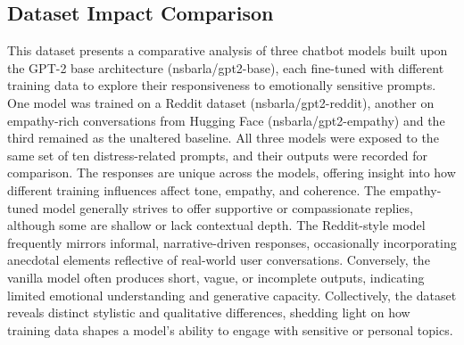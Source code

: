 \subsection{Dataset Impact Comparison} 
This dataset presents a comparative analysis of three chatbot models built upon the GPT-2 base architecture (nsbarla/gpt2-base), each fine-tuned with different training data to explore their responsiveness to emotionally sensitive prompts. One model was trained on a Reddit dataset (nsbarla/gpt2-reddit), another on empathy-rich conversations from Hugging Face (nsbarla/gpt2-empathy) and the third remained as the unaltered baseline. All three models were exposed to the same set of ten distress-related prompts, and their outputs were recorded for comparison. The responses are unique across the models, offering insight into how different training influences affect tone, empathy, and coherence. The empathy-tuned model generally strives to offer supportive or compassionate replies, although some are shallow or lack contextual depth. The Reddit-style model frequently mirrors informal, narrative-driven responses, occasionally incorporating anecdotal elements reflective of real-world user conversations. Conversely, the vanilla model often produces short, vague, or incomplete outputs, indicating limited emotional understanding and generative capacity. Collectively, the dataset reveals distinct stylistic and qualitative differences, shedding light on how training data shapes a model’s ability to engage with sensitive or personal topics.
